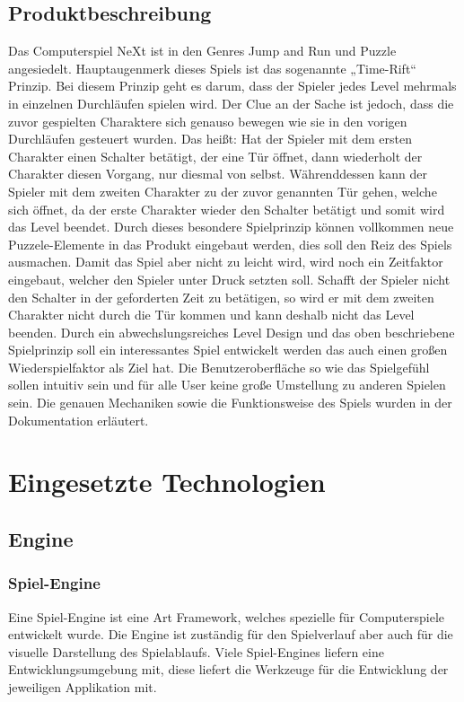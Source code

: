 \section{Produktbeschreibung}
Das Computerspiel NeXt ist in den Genres Jump and Run und Puzzle angesiedelt. Hauptaugenmerk dieses Spiels ist das sogenannte „Time-Rift“ Prinzip. Bei diesem Prinzip geht es darum, dass der Spieler jedes Level mehrmals in einzelnen Durchläufen spielen wird. Der Clue an der Sache ist jedoch, dass die zuvor gespielten Charaktere sich genauso bewegen wie sie in den vorigen Durchläufen gesteuert wurden. Das heißt: Hat der Spieler mit dem ersten Charakter einen Schalter betätigt, der eine Tür öffnet, dann wiederholt der Charakter diesen Vorgang, nur diesmal von selbst. Währenddessen kann der Spieler mit dem zweiten Charakter zu der zuvor genannten Tür gehen, welche sich öffnet, da der erste Charakter wieder den Schalter betätigt und somit wird das Level beendet. Durch dieses besondere Spielprinzip können vollkommen neue Puzzele-Elemente in das Produkt eingebaut werden, dies soll den Reiz des Spiels ausmachen.  Damit das Spiel aber nicht zu leicht wird, wird noch ein Zeitfaktor eingebaut, welcher den Spieler unter Druck setzten soll. Schafft der Spieler nicht den Schalter in der geforderten Zeit zu betätigen, so wird er mit dem zweiten Charakter nicht durch die Tür kommen und kann deshalb nicht das Level beenden. Durch ein abwechslungsreiches Level Design und das oben beschriebene Spielprinzip soll ein interessantes Spiel entwickelt werden das auch einen großen Wiederspielfaktor als Ziel hat. Die Benutzeroberfläche so wie das Spielgefühl sollen intuitiv sein und für alle User keine große Umstellung zu anderen Spielen sein. Die genauen Mechaniken sowie die Funktionsweise des Spiels wurden in der Dokumentation erläutert.  
\chapter{Eingesetzte Technologien}
\section{Engine}

\subsection{Spiel-Engine}
Eine Spiel-Engine ist eine Art Framework, welches spezielle für Computerspiele entwickelt wurde. Die Engine ist zuständig für den Spielverlauf aber auch für die visuelle Darstellung des Spielablaufs. Viele Spiel-Engines liefern eine Entwicklungsumgebung mit, diese liefert die Werkzeuge für die Entwicklung der jeweiligen Applikation mit. \cite{Spiel-Engine}

